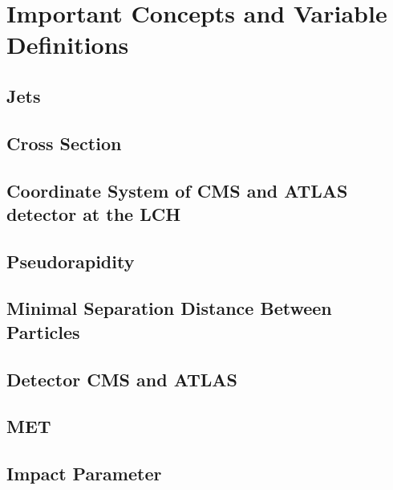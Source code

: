  \chapter{Important Concepts and Variable Definitions}
 
 \section{Jets}
 
 \section{Cross Section}
 
 \section{Coordinate System of CMS and ATLAS detector at the LCH}
 
 \section{Pseudorapidity}
 
 \section{Minimal Separation Distance Between Particles}
 
 \section{Detector CMS and ATLAS}
 
 \section{MET}
 
 \section{Impact Parameter}
